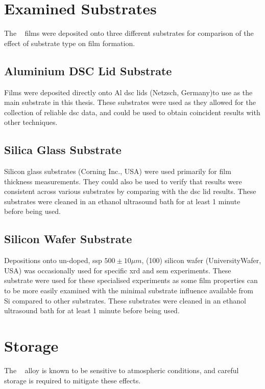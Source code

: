 \section{Examined Substrates} 
The \MgZnCa~ films were deposited onto three different substrates for comparison of the effect of substrate type on film formation.

\subsection{Aluminium DSC Lid Substrate}
Films were deposited directly onto Al \gls{dsc} lids (Netzsch, Germany)to use as the main substrate in this thesis. These substrates were used as they allowed for the collection of reliable \gls{dsc} data, and could be used to obtain coincident results with other techniques. 

\subsection{Silica Glass Substrate}
Silicon glass substrates (Corning Inc., USA) were used primarily for film thickness measurements. They could also be used to verify that results were consistent across various substrates by comparing with the \gls{dsc} lid results. These substrates were cleaned in an ethanol ultrasound bath for at least 1 minute before being used. 

\subsection{Silicon Wafer Substrate}
Depositions onto un-doped, \gls{ssp} $500 \pm 10 \mu m$,  (100) silicon wafer (UniversityWafer, USA) was occasionally used for specific \gls{xrd} and \gls{sem} experiments. These substrate were used for these specialised experiments as some film properties can to be more easily examined with the minimal substrate influence available from Si compared to other substrates. These substrates were cleaned in an ethanol ultrasound bath for at least 1 minute before being used. 

\section{Storage}
The \MgZnCa~ alloy is known to be sensitive to atmospheric conditions, and careful storage is required to mitigate these effects. 

